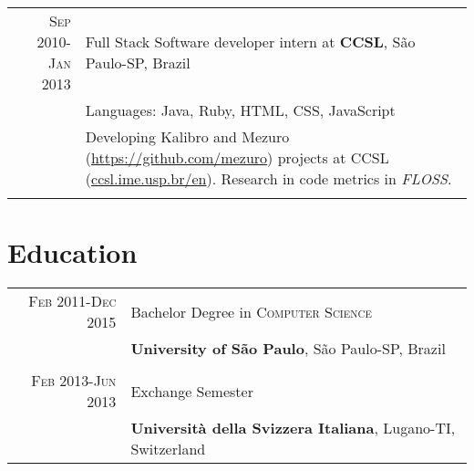 \documentclass[a4paper,10pt]{article} %
\begin{document}
\begin{tabular}{r|p{11cm}}

\textsc{Sep 2010-Jan 2013} & Full Stack Software developer intern at \textbf{CCSL}, São Paulo-SP, Brazil \emph{}\\
& \footnotesize{Languages: Java, Ruby, HTML, CSS, JavaScript}\\
       & \footnotesize{Developing Kalibro and Mezuro (\href{https://github.com/mezuro}{https://github.com/mezuro}) projects at CCSL (\href{http://ccsl.ime.usp.br/en}{ccsl.ime.usp.br/en}). Research in code metrics in \emph{FLOSS}.}\\
\multicolumn{2}{c}{} \\



\end{tabular}



\section{Education}

\begin{tabular}{r|p{11cm}}
\textsc{Feb} 2011-\textsc{Dec} 2015& Bachelor Degree in \textsc{}\textsc{Computer Science} \\& \normalsize\textbf{University of São Paulo}, São Paulo-SP, Brazil\\
\multicolumn{2}{c}{}\\


\textsc{Feb} 2013-\textsc{Jun} 2013& Exchange Semester\\
    & \textbf{Università della Svizzera Italiana}, Lugano-TI, Switzerland\\
    

\end{tabular}
\end{document}
